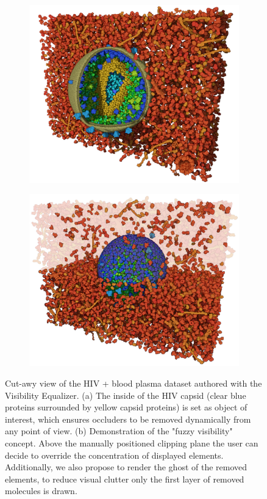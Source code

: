 \begin{figure}
	\centering
	\begin{subfigure}{.6\textwidth}
		\centering
		\includegraphics[width=.99\linewidth]{"graphics/Picture4"}
		\caption{}
		\label{fig:sub1}
	\end{subfigure}%
	\begin{subfigure}{.4\textwidth}
		\centering
		\includegraphics[width=.99\linewidth]{"graphics/Picture8"}
		\caption{}
		\label{fig:sub2}
	\end{subfigure}
	\caption{Cut-awy view of the HIV + blood plasma dataset authored with the Visibility Equalizer. (a) The inside of the HIV capsid (clear blue proteins surrounded by yellow capsid proteins) is set as object of interest, which ensures occluders to be removed dynamically from any point of view. (b) Demonstration of the "fuzzy visibility" concept. Above the manually positioned clipping plane the user can decide to override the concentration of displayed elements. Additionally, we also propose to render the ghost of the removed elements, to reduce visual clutter only the first layer of removed molecules is drawn.}
	\label{fig:test2}
\end{figure}


